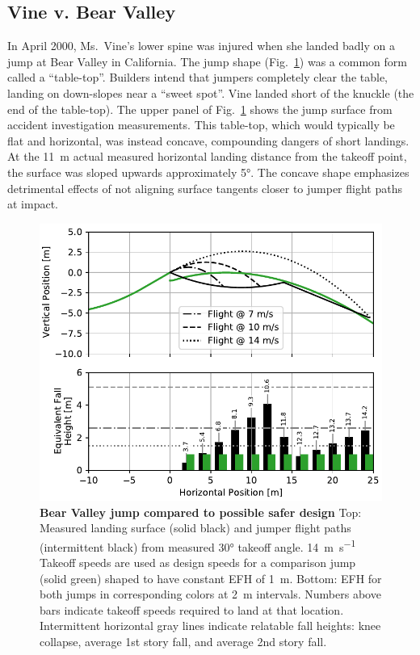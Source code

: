 \documentclass[smallextended]{svjour3}       %
\begin{document}
\subsection{Vine v. Bear Valley}
\label{sec:vine}
%
In April 2000, Ms.~Vine's lower spine was injured when she landed badly on a
jump at Bear Valley in California. The jump shape
(Fig.~\ref{fig:vine-v-bear-valley}) was a common form called a ``table-top''.
Builders intend that jumpers completely clear the table, landing on down-slopes
near a ``sweet spot''.  Vine landed short of the knuckle (the end of the
table-top). The upper panel of Fig.~\ref{fig:vine-v-bear-valley} shows the jump
surface from accident investigation measurements. This table-top, which would
typically be flat and horizontal, was instead concave, compounding dangers of
short landings. At the 11~\si{\meter} actual measured horizontal landing
distance from the takeoff point, the surface was sloped upwards approximately
5\si{\degree}. The concave shape emphasizes detrimental effects of not aligning
surface tangents closer to jumper flight paths at impact.
%
\begin{figure}
  \centering
  \includegraphics[width=5.25in]{figures/vine-v-bear-valley.pdf}
  \caption{\textbf{Bear Valley jump compared to possible safer design}
  Top: Measured landing surface (solid black) and jumper flight paths
  (intermittent black) from measured 30\si{\degree} takeoff angle.
  14~\si{\meter\per\second} Takeoff speeds are used as design speeds \cite{Levy2015} for a
  comparison jump (solid green) shaped to have constant EFH of 1~\si{\meter}.
  Bottom: EFH for both jumps in corresponding
  colors at 2~\si{\meter} intervals. Numbers above bars indicate
  takeoff speeds required to land at that location.
  Intermittent horizontal gray lines indicate relatable fall heights: knee
  collapse, average 1st story fall, and average 2nd story fall.
  }
  \label{fig:vine-v-bear-valley}
\end{figure}
\end{document}
